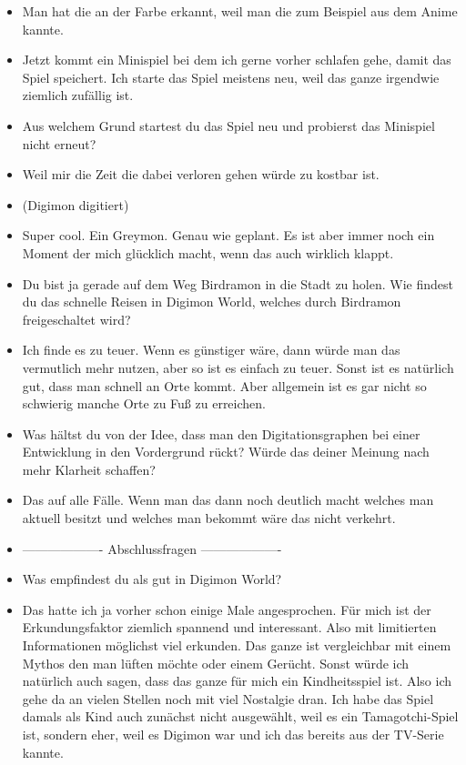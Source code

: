 {\begin{itemize}[]
    \item {} Man hat die an der Farbe erkannt, weil man die zum Beispiel aus dem Anime kannte.
    \item {} Jetzt kommt ein Minispiel bei dem ich gerne vorher schlafen gehe, damit das Spiel speichert. Ich starte das Spiel meistens neu, weil das ganze irgendwie ziemlich zufällig ist.
    \item {} Aus welchem Grund startest du das Spiel neu und probierst das Minispiel nicht erneut?
    \item {} Weil mir die Zeit die dabei verloren gehen würde zu kostbar ist.
    \item {} (Digimon digitiert)
    \item {} Super cool. Ein Greymon. Genau wie geplant. Es ist aber immer noch ein Moment der mich glücklich macht, wenn das auch wirklich klappt.
    \item {} Du bist ja gerade auf dem Weg Birdramon in die Stadt zu holen. Wie findest du das schnelle Reisen in Digimon World, welches durch Birdramon freigeschaltet wird?
    \item {} Ich finde es zu teuer. Wenn es günstiger wäre, dann würde man das vermutlich mehr nutzen, aber so ist es einfach zu teuer. Sonst ist es natürlich gut, dass man schnell an Orte kommt. Aber allgemein ist es gar nicht so schwierig manche Orte zu Fuß zu erreichen.
    \item {} Was hältst du von der Idee, dass man den Digitationsgraphen bei einer Entwicklung in den Vordergrund rückt? Würde das deiner Meinung nach mehr Klarheit schaffen?
    \item {} Das auf alle Fälle. Wenn man das dann noch deutlich macht welches man aktuell besitzt und welches man bekommt wäre das nicht verkehrt. 
    \item {-------------------} Abschlussfragen {-------------------}
    \item {} Was empfindest du als gut in Digimon World?
    \item {} Das hatte ich ja vorher schon einige Male angesprochen. Für mich ist der Erkundungsfaktor ziemlich spannend und interessant. Also mit limitierten Informationen möglichst viel erkunden. Das ganze ist vergleichbar mit einem Mythos den man lüften möchte oder einem Gerücht. Sonst würde ich natürlich auch sagen, dass das ganze für mich ein Kindheitsspiel ist. Also ich gehe da an vielen Stellen noch mit viel Nostalgie dran. Ich habe das Spiel damals als Kind auch zunächst nicht ausgewählt, weil es ein Tamagotchi-Spiel ist, sondern eher, weil es Digimon war und ich das bereits aus der TV-Serie kannte.

\end{itemize}}
